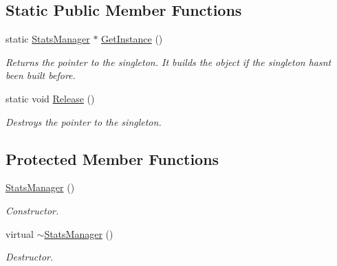 \subsection*{Static Public Member Functions}
\begin{DoxyCompactItemize}
\item 
\mbox{\label{class_geometry_engine_1_1_stats_manager_a86502469855289c2792d328a76e31e59}} 
static \mbox{\hyperlink{class_geometry_engine_1_1_stats_manager}{Stats\+Manager}} $\ast$ \mbox{\hyperlink{class_geometry_engine_1_1_stats_manager_a86502469855289c2792d328a76e31e59}{Get\+Instance}} ()
\begin{DoxyCompactList}\small\item\em Returns the pointer to the singleton. It builds the object if the singleton hasn\textquotesingle{}t been built before. \end{DoxyCompactList}\item 
\mbox{\label{class_geometry_engine_1_1_stats_manager_ac26db54497418525b18a687aab37596a}} 
static void \mbox{\hyperlink{class_geometry_engine_1_1_stats_manager_ac26db54497418525b18a687aab37596a}{Release}} ()
\begin{DoxyCompactList}\small\item\em Destroys the pointer to the singleton. \end{DoxyCompactList}\end{DoxyCompactItemize}
\subsection*{Protected Member Functions}
\begin{DoxyCompactItemize}
\item 
\mbox{\label{class_geometry_engine_1_1_stats_manager_a9f4a73fc373b43709b7fd9f39e5fd244}} 
\mbox{\hyperlink{class_geometry_engine_1_1_stats_manager_a9f4a73fc373b43709b7fd9f39e5fd244}{Stats\+Manager}} ()
\begin{DoxyCompactList}\small\item\em Constructor. \end{DoxyCompactList}\item 
\mbox{\label{class_geometry_engine_1_1_stats_manager_acf87c19aa2cf11abf017ff807872f139}} 
virtual \mbox{\hyperlink{class_geometry_engine_1_1_stats_manager_acf87c19aa2cf11abf017ff807872f139}{$\sim$\+Stats\+Manager}} ()
\begin{DoxyCompactList}\small\item\em Destructor. \end{DoxyCompactList}\end{DoxyCompactItemize}
